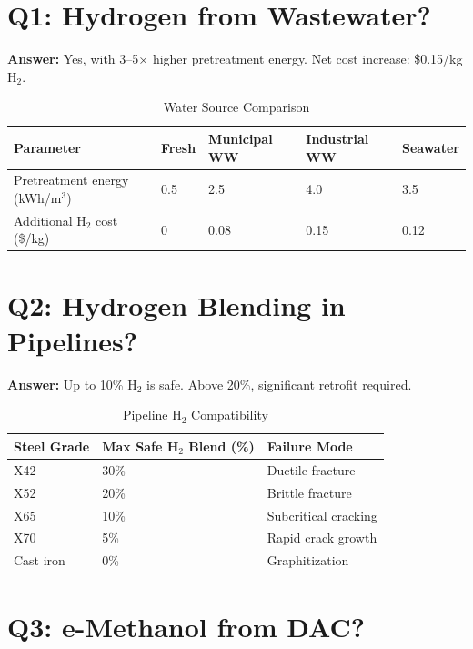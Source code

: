 \documentclass[12pt,twoside,openany]{book}
\begin{document}
\section{Q1: Hydrogen from Wastewater?}

\textbf{Answer:} Yes, with 3--5$\times$ higher pretreatment energy. Net cost increase: \$0.15/kg H$_2$.

\begin{table}[htbp]
    \centering
    \caption{Water Source Comparison}
    \label{tab:wastewater}
    \begin{tabular}{L{3.5cm} C{2cm} C{2.5cm} C{2.5cm} C{2cm}}
    \hline
    \textbf{Parameter} & \textbf{Fresh} & \textbf{Municipal WW}
                       & \textbf{Industrial WW} & \textbf{Seawater} \\
    \hline
    Pretreatment energy (kWh/m$^3$) & 0.5 & 2.5 & 4.0 & 3.5 \\
    Additional H$_2$ cost (\$/kg)   & 0   & 0.08 & 0.15 & 0.12 \\
    \hline
    \end{tabular}
\end{table}

\section{Q2: Hydrogen Blending in Pipelines?}

\textbf{Answer:} Up to 10\% H$_2$ is safe. Above 20\%, significant retrofit required.

\begin{table}[htbp]
    \centering
    \caption{Pipeline H$_2$ Compatibility}
    \label{tab:pipeline}
    \begin{tabular}{L{3cm} C{2.5cm} C{3cm}}
    \hline
    \textbf{Steel Grade} & \textbf{Max Safe H$_2$ Blend (\%)} & \textbf{Failure Mode} \\
    \hline
    X42      & 30\% & Ductile fracture      \\
    X52      & 20\% & Brittle fracture      \\
    X65      & 10\% & Subcritical cracking  \\
    X70      & 5\%  & Rapid crack growth    \\
    Cast iron & 0\% & Graphitization        \\
    \hline
    \end{tabular}
\end{table}

\section{Q3: e-Methanol from DAC?}
\end{document}

